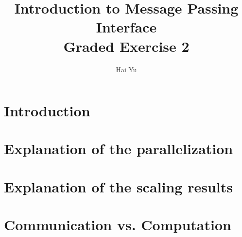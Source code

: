 \documentclass{article}
\title{
    \textbf{Introduction to Message Passing Interface} \\
    \large Graded Exercise 2
}
\author{Hai Yu}
\date{}
\begin{document}
\maketitle

\section{Introduction}


\section{Explanation of the parallelization}


\section{Explanation of the scaling results}


\section{Communication vs. Computation}
\end{document}
